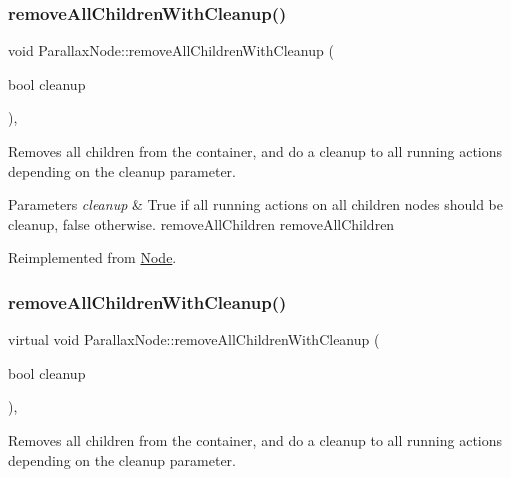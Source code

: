 \subsubsection{\texorpdfstring{remove\+All\+Children\+With\+Cleanup()}{removeAllChildrenWithCleanup()}\hspace{0.1cm}{\footnotesize\ttfamily [1/2]}}
{\footnotesize\ttfamily void Parallax\+Node\+::remove\+All\+Children\+With\+Cleanup (\begin{DoxyParamCaption}\item[{bool}]{cleanup }\end{DoxyParamCaption})\hspace{0.3cm}{\ttfamily [override]}, {\ttfamily [virtual]}}

Removes all children from the container, and do a cleanup to all running actions depending on the cleanup parameter.


\begin{DoxyParams}{Parameters}
{\em cleanup} & True if all running actions on all children nodes should be cleanup, false otherwise.  remove\+All\+Children  remove\+All\+Children \\
\hline
\end{DoxyParams}


Reimplemented from \hyperlink{classNode_aca66e2b385c3dbf1a6f55627c4a13192}{Node}.

\mbox{\label{classParallaxNode_acff596a0ad508105213baddf02cb05e8}} 
\subsubsection{\texorpdfstring{remove\+All\+Children\+With\+Cleanup()}{removeAllChildrenWithCleanup()}\hspace{0.1cm}{\footnotesize\ttfamily [2/2]}}
{\footnotesize\ttfamily virtual void Parallax\+Node\+::remove\+All\+Children\+With\+Cleanup (\begin{DoxyParamCaption}\item[{bool}]{cleanup }\end{DoxyParamCaption})\hspace{0.3cm}{\ttfamily [override]}, {\ttfamily [virtual]}}

Removes all children from the container, and do a cleanup to all running actions depending on the cleanup parameter.


